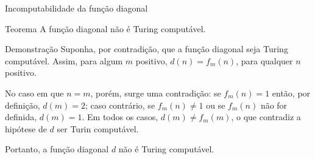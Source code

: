 \begin{frame}[fragile]{Incomputabilidade da função diagonal}

    \begin{block}{Teorema}
        A função diagonal não é Turing computável.
    \end{block}

    \begin{block}{Demonstração}
        Suponha, por contradição, que a função diagonal seja Turing computável. Assim, para algum
        $m$ positivo, $d(n) = f_m(n)$, para qualquer $n$ positivo. 

        \vspace{0.1in}

        No caso em que $n = m$, porém, surge uma contradição: se $f_m(n) = 1$ então, por definição,
        $d(m) = 2$; caso contrário, se $f_m(n)\neq 1$ ou se $f_m(n)$ não for definida, $d(m) = 1$.
        Em todos os casos, $d(m) \neq f_m(m)$, o que contradiz a hipótese de $d$ ser Turin
        computável.
     
        \vspace{0.1in}

        Portanto, a função diagonal $d$ não é Turing computável.
    \end{block}

\end{frame}
